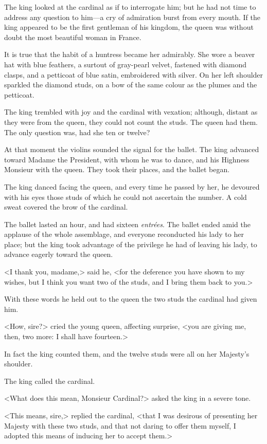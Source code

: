 The king looked at the cardinal as if to interrogate him; but he had not time to address any question to him---a cry of admiration burst from every mouth. If the king appeared to be the first gentleman of his kingdom, the queen was without doubt the most beautiful woman in France. 

It is true that the habit of a huntress became her admirably. She wore a beaver hat with blue feathers, a surtout of gray-pearl velvet, fastened with diamond clasps, and a petticoat of blue satin, embroidered with silver. On her left shoulder sparkled the diamond studs, on a bow of the same colour as the plumes and the petticoat. 

The king trembled with joy and the cardinal with vexation; although, distant as they were from the queen, they could not count the studs. The queen had them. The only question was, had she ten or twelve? 

At that moment the violins sounded the signal for the ballet. The king advanced toward Madame the President, with whom he was to dance, and his Highness Monsieur with the queen. They took their places, and the ballet began. 

The king danced facing the queen, and every time he passed by her, he devoured with his eyes those studs of which he could not ascertain the number. A cold sweat covered the brow of the cardinal. 

The ballet lasted an hour, and had sixteen \textit{entrées}. The ballet ended amid the applause of the whole assemblage, and everyone reconducted his lady to her place; but the king took advantage of the privilege he had of leaving his lady, to advance eagerly toward the queen. 

<I thank you, madame,> said he, <for the deference you have shown to my wishes, but I think you want two of the studs, and I bring them back to you.> 

With these words he held out to the queen the two studs the cardinal had given him. 

<How, sire?> cried the young queen, affecting surprise, <you are giving me, then, two more: I shall have fourteen.> 

In fact the king counted them, and the twelve studs were all on her Majesty's shoulder. 

The king called the cardinal. 

<What does this mean, Monsieur Cardinal?> asked the king in a severe tone. 

<This means, sire,> replied the cardinal, <that I was desirous of presenting her Majesty with these two studs, and that not daring to offer them myself, I adopted this means of inducing her to accept them.> 

